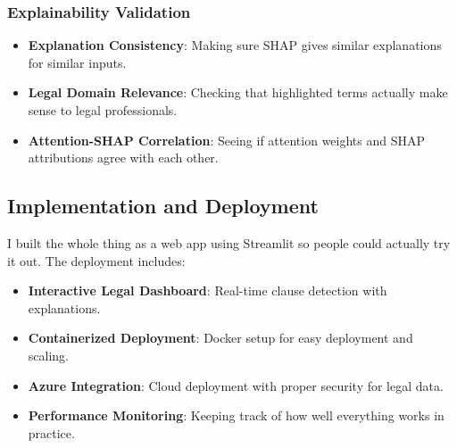 \subsubsection{Explainability Validation}

\begin{itemize}
    \item \textbf{Explanation Consistency}: Making sure SHAP gives similar explanations for similar inputs.
    \item \textbf{Legal Domain Relevance}: Checking that highlighted terms actually make sense to legal professionals.
    \item \textbf{Attention-SHAP Correlation}: Seeing if attention weights and SHAP attributions agree with each other.
\end{itemize}

\subsection{Implementation and Deployment}

I built the whole thing as a web app using Streamlit so people could actually try it out. The deployment includes:

\begin{itemize}
    \item \textbf{Interactive Legal Dashboard}: Real-time clause detection with explanations.
    \item \textbf{Containerized Deployment}: Docker setup for easy deployment and scaling.
    \item \textbf{Azure Integration}: Cloud deployment with proper security for legal data.
    \item \textbf{Performance Monitoring}: Keeping track of how well everything works in practice.
\end{itemize}